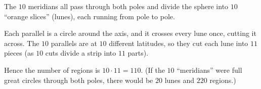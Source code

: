 The $10$ meridians all pass through both poles and divide the sphere into $10$ ``orange slices'' (lunes), each running from pole to pole.

Each parallel is a circle around the axis, and it crosses every lune once, cutting it across. The $10$ parallels are at $10$ different latitudes, so they cut each lune into $11$ pieces (as $10$ cuts divide a strip into $11$ parts).

Hence the number of regions is $10\cdot11=\boxed{110}$. (If the $10$ ``meridians'' were full great circles through both poles, there would be $20$ lunes and $220$ regions.)
